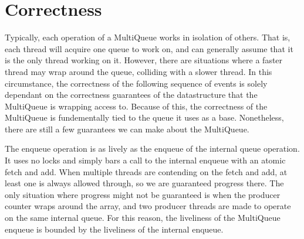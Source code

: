 \documentclass[12pt]{report}
\begin{document}
\begin{scriptsize}
\begin{algorithm}[H]
\end{algorithm}
\end{scriptsize}

\section{Correctness}
Typically, each operation of a MultiQueue works in isolation of others. That
is, each thread will acquire one queue to work on, and can generally assume
that it is the only thread working on it. However, there are situations where a
faster thread may wrap around the queue, colliding with a slower thread. In
this circumstance, the correctness of the following sequence of events is
solely dependant on the correctness guarantees of the datastructure that the
MultiQueue is wrapping access to. Because of this, the correctness of the
MultiQueue is fundementally tied to the queue it uses as a base. Nonetheless,
there are still a few guarantees we can make about the MultiQueue.

The enqueue operation is as lively as the enqueue of the internal queue
operation. It uses no locks and simply bars a call to the internal enqueue with
an atomic fetch and add. When multiple threads are contending on the fetch and
add, at least one is always allowed through, so we are guaranteed progress
there. The only situation where progress might not be guaranteed is when the
producer counter wraps around the array, and two producer threads are made to
operate on the same internal queue. For this reason, the liveliness of the
MultiQueue enqueue is bounded by the liveliness of the internal enqueue.
\end{document}
